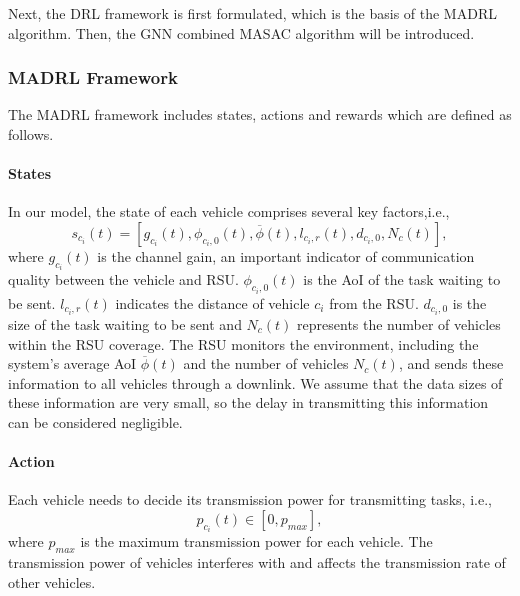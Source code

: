 \documentclass[lettersize,journal,onecolumn]{IEEEtran}
\begin{document}
Next, the DRL framework is first formulated, which is the basis of the MADRL algorithm. Then, the GNN combined MASAC algorithm will be introduced.
\subsubsection{MADRL Framework} The MADRL framework includes states, actions and rewards which are defined as follows.

\paragraph{States}
In our model, the state of each vehicle comprises several key factors,i.e.,
\begin{equation}
{{s}_{{{c}_{i}}}}(t)=[{{g}_{{{c}_{i}}}}\left( t \right),{{\phi }_{{{{c}}_{i}},0}}\left( t \right),\overline{\phi }(t),{{l}_{{{c}_{i}},r}}(t),{{d}_{{{{c}}_{i}},0}},{{N}_{c}}(t)]
\label{eq21},
\end{equation}
where ${{g}_{{{c}_{i}}}}\left( t \right)$ is the channel gain, an important indicator of communication quality between the vehicle and RSU. ${{\phi }_{{{{c}}_{i}},0}}\left( t \right)$ is the AoI of the task waiting to be sent. ${{l}_{{{c}_{i}},r}}(t)$ indicates the distance of vehicle ${{{c}}_{i}}$ from the RSU. ${{d}_{{{{c}}_{i}},0}}$ is the size of the task waiting to be sent and ${{N}_{c}}(t)$ represents the number of vehicles within the RSU coverage. The RSU monitors the environment, including the system's average AoI $\overline{\phi }(t)$ and the number of vehicles ${{N}_{c}}(t)$, and sends these information to all vehicles through a downlink. We assume that the data sizes of these information are very small, so the delay in transmitting this information can be considered negligible.

\paragraph{Action}
Each vehicle needs to decide its transmission power for transmitting tasks, i.e.,
\begin{equation}
{{p}_{{{c}_{i}}}}(t)\in [0,{{p}_{{max}}}]
\label{eq22},
\end{equation}
where ${{p}_{{max}}}$ is the maximum transmission power for each vehicle. The transmission power of vehicles interferes with and affects the transmission rate of other vehicles.
\end{document}

